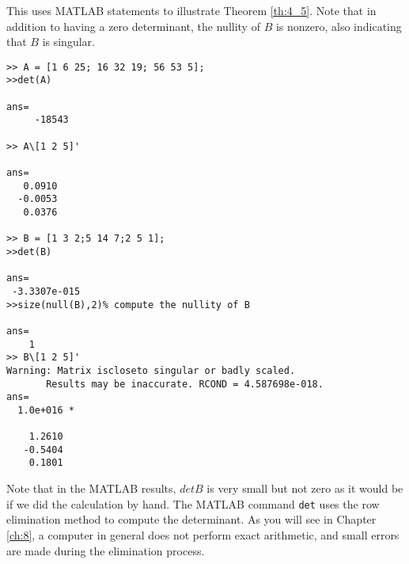 \documentclass[../main.tex]{subfiles}
\begin{document}
\begin{example} \label{ex:4_14}
  This uses MATLAB statements to illustrate Theorem \ref{th:4_5}. Note that in addition to having a zero determinant, the nullity of \(B\) is nonzero, also indicating that \(B\) is singular.
  \begin{lstlisting}[numbers=none,frame=none]
>> A = [1 6 25; 16 32 19; 56 53 5];
>>det(A)

ans=
     -18543
     
>> A\[1 2 5]'

ans=
   0.0910
  -0.0053
   0.0376
	
>> B = [1 3 2;5 14 7;2 5 1];
>>det(B)

ans=
 -3.3307e-015
>>size(null(B),2)% compute the nullity of B

ans=
    1
>> B\[1 2 5]'
Warning: Matrix iscloseto singular or badly scaled.
       Results may be inaccurate. RCOND = 4.587698e-018.
ans=
  1.0e+016 *
	
    1.2610
   -0.5404
    0.1801
  \end{lstlisting}
  Note that in the MATLAB results, \(det B\) is very small but not zero as it would be if we did the calculation by hand. The MATLAB command \texttt{det} uses the row elimination method to compute the determinant. As you will see in Chapter \ref{ch:8}, a computer in general does not perform exact arithmetic, and small errors are made during the elimination process.
\end{example}
\end{document}
